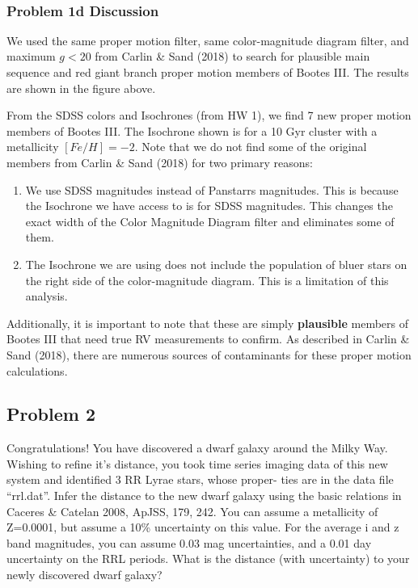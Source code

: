 \documentclass[11pt]{article}
\providecommand{\tightlist}{%
      \setlength{\itemsep}{0pt}\setlength{\parskip}{0pt}}
\begin{document}
    \begin{center}
    \end{center}
    { \hspace*{\fill} \\}
    
    \subsubsection{Problem 1d Discussion}\label{problem-1d-discussion}

We used the same proper motion filter, same color-magnitude diagram
filter, and maximum \(g < 20\) from Carlin \& Sand (2018) to search for
plausible main sequence and red giant branch proper motion members of
Bootes III. The results are shown in the figure above.

From the SDSS colors and Isochrones (from HW 1), we find 7 new proper
motion members of Bootes III. The Isochrone shown is for a 10 Gyr
cluster with a metallicity \([Fe/H]=-2\). Note that we do not find some
of the original members from Carlin \& Sand (2018) for two primary
reasons:

\begin{enumerate}
\def\labelenumi{\arabic{enumi}.}
\tightlist
\item
  We use SDSS magnitudes instead of Panstarrs magnitudes. This is
  because the Isochrone we have access to is for SDSS magnitudes. This
  changes the exact width of the Color Magnitude Diagram filter and
  eliminates some of them.
\item
  The Isochrone we are using does not include the population of bluer
  stars on the right side of the color-magnitude diagram. This is a
  limitation of this analysis.
\end{enumerate}

Additionally, it is important to note that these are simply
\textbf{plausible} members of Bootes III that need true RV measurements
to confirm. As described in Carlin \& Sand (2018), there are numerous
sources of contaminants for these proper motion calculations.

    \subsection{Problem 2}\label{problem-2}

Congratulations! You have discovered a dwarf galaxy around the Milky
Way. Wishing to refine it's distance, you took time series imaging data
of this new system and identified 3 RR Lyrae stars, whose proper- ties
are in the data file ``rrl.dat''. Infer the distance to the new dwarf
galaxy using the basic relations in Caceres \& Catelan 2008, ApJSS, 179,
242. You can assume a metallicity of Z=0.0001, but assume a 10\%
uncertainty on this value. For the average i and z band magnitudes, you
can assume 0.03 mag uncertainties, and a 0.01 day uncertainty on the RRL
periods. What is the distance (with uncertainty) to your newly
discovered dwarf galaxy?
\end{document}
